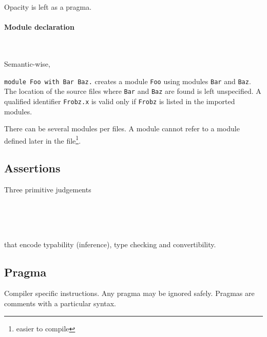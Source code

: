 \documentclass{article}
\begin{document}
Opacity is left as a pragma.

\paragraph{Module declaration}
\begin{bnf*}
    \\
\end{bnf*}

Semantic-wise,

\verb|module Foo with Bar Baz.|
creates a module \verb+Foo+ using modules \verb|Bar| and \verb|Baz|.
The location of the source files where \verb|Bar| and \verb|Baz| are found is
left unspecified.
A qualified identifier \verb|Frobz.x| is valid only if \verb|Frobz| is listed
in the imported modules.

There can be several modules per files.
A module cannot refer to a module defined later in the
file\footnote{easier to compile}.

\subsection{Assertions}

Three primitive judgements
\begin{bnf*}
	\\
	 \\
	\\
\end{bnf*}
that encode typability (inference), type checking and convertibility.

\subsection{Pragma}

Compiler specific instructions. Any pragma may be ignored safely. Pragmas are comments with a particular syntax.

\begin{bnf*}
\end{bnf*}
\end{document}
